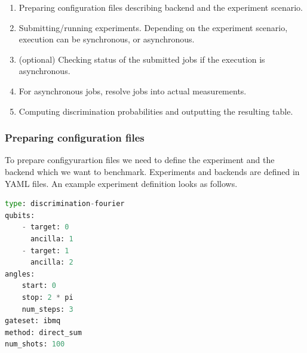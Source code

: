\documentclass[preprint,12pt, a4paper, dvipsnames]{elsarticle}
\newcommand{\1}{{\rm 1\hspace{-0.9mm}l}}
\begin{document}
\begin{enumerate}

\item Preparing configuration files describing backend and the experiment scenario.
\item Submitting/running experiments. Depending on the experiment scenario, execution can be synchronous, or asynchronous.
\item (optional) Checking status of the submitted jobs if the execution is asynchronous.
\item For asynchronous jobs, 
resolve jobs into actual measurements.
\item Computing discrimination probabilities and outputting the resulting table.
\end{enumerate} 
\subsubsection{Preparing configuration files}
To prepare configyurartion files we need to define the experiment and the   backend 
which we want to benchmark. Experiments and backends are defined in YAML files. An example experiment definition looks as follows.


\begin{lstlisting}[language=Python, caption=Defining the experiment]
type: discrimination-fourier
qubits:
	- target: 0
	  ancilla: 1
	- target: 1
      ancilla: 2
angles:
	start: 0
	stop: 2 * pi
	num_steps: 3
gateset: ibmq
method: direct_sum
num_shots: 100
\end{lstlisting}
\end{document}
